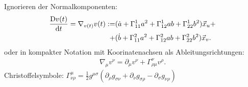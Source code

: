 \documentclass[mathserif]{beamer}
\newcommand{\vx}{\vec{x}}
\theoremstyle{definition}
\begin{document}
	\begin{frame}
		Ignorieren der Normalkomponenten:
		\begin{align*}
			\frac{{\rm D} v(t)}{{\rm d}t}=\nabla_{v(t)} v(t) :=& (\dot{a} + \Gamma^1_{11}a^2+\Gamma^1_{12}ab+\Gamma^1_{22}b^2)\vx_u+\notag\\
			+&(\dot{b} + \Gamma^2_{11}a^2+\Gamma^2_{12}ab+\Gamma^2_{22}b^2)\vx_v.
		\end{align*}
		\pause
		oder in kompakter Notation mit Koorinatenachsen als Ableitungsrichtungen:
		\begin{align*}
			\nabla_\mu v^\nu=\partial_\mu v^\nu +\Gamma^\nu_{\rho\mu}v^\rho.
		\end{align*}
		\pause
		Christoffelsymbole: $\Gamma^\mu_{\nu\rho}=\frac{1}{2}g^{\mu\sigma}(\partial_\rho g_{\sigma \nu}+\partial_\nu g_{\sigma \rho}-\partial_\sigma g_{\nu\rho})$
	\end{frame}
\end{document}
